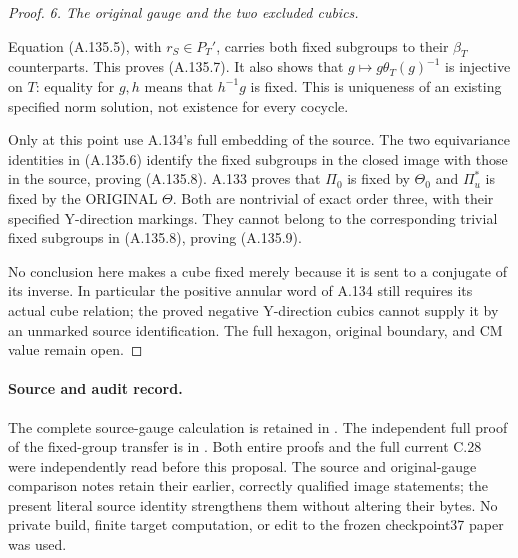 \begin{proof}
\emph{6. The original gauge and the two excluded cubics.}\par
Equation (A.135.5), with \(r_S\in P_T'\), carries both fixed
subgroups to their \(\beta_T\) counterparts. This proves
(A.135.7). It also shows that \(g\mapsto g\theta_T(g)^{-1}\)
is injective on \(T\): equality for \(g,h\) means that
\(h^{-1}g\) is fixed. This is uniqueness of an existing specified
norm solution, not existence for every cocycle.

Only at this point use A.134's full embedding of the source.
The two equivariance identities in (A.135.6) identify the fixed
subgroups in the closed image with those in the source, proving
(A.135.8). A.133 proves that \(\Pi_0\) is fixed by \(\Theta_0\)
and \(\Pi_u^*\) is fixed by the ORIGINAL \(\Theta\). Both
are nontrivial of exact order three, with their specified
Y-direction markings. They cannot belong to the corresponding
trivial fixed subgroups in (A.135.8), proving (A.135.9).

No conclusion here makes a cube fixed merely because it is sent
to a conjugate of its inverse. In particular the positive
annular word of A.134 still requires its actual cube relation;
the proved negative Y-direction cubics cannot supply it by an
unmarked source identification. The full hexagon, original
boundary, and CM value remain open.
\end{proof}

\paragraph{Source and audit record.}
The complete source-gauge calculation is retained in
.
The independent full proof of the fixed-group transfer is in
.
Both entire proofs and the full current C.28 were independently
read before this proposal. The source and original-gauge comparison
notes retain their earlier, correctly qualified image statements;
the present literal source identity strengthens them without
altering their bytes. No private build, finite target computation,
or edit to the frozen checkpoint37 paper was used.
